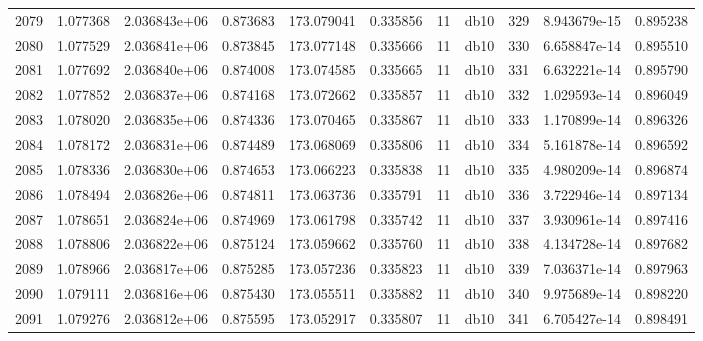 \begin{tabular}{lrrrrrrlrrr}
2079 &    1.077368 &        2.036843e+06 &  0.873683 &              173.079041 &    0.335856 &      11 &         db10 &    329 &   8.943679e-15 &      0.895238 \\
2080 &    1.077529 &        2.036841e+06 &  0.873845 &              173.077148 &    0.335666 &      11 &         db10 &    330 &   6.658847e-14 &      0.895510 \\
2081 &    1.077692 &        2.036840e+06 &  0.874008 &              173.074585 &    0.335665 &      11 &         db10 &    331 &   6.632221e-14 &      0.895790 \\
2082 &    1.077852 &        2.036837e+06 &  0.874168 &              173.072662 &    0.335857 &      11 &         db10 &    332 &   1.029593e-14 &      0.896049 \\
2083 &    1.078020 &        2.036835e+06 &  0.874336 &              173.070465 &    0.335867 &      11 &         db10 &    333 &   1.170899e-14 &      0.896326 \\
2084 &    1.078172 &        2.036831e+06 &  0.874489 &              173.068069 &    0.335806 &      11 &         db10 &    334 &   5.161878e-14 &      0.896592 \\
2085 &    1.078336 &        2.036830e+06 &  0.874653 &              173.066223 &    0.335838 &      11 &         db10 &    335 &   4.980209e-14 &      0.896874 \\
2086 &    1.078494 &        2.036826e+06 &  0.874811 &              173.063736 &    0.335791 &      11 &         db10 &    336 &   3.722946e-14 &      0.897134 \\
2087 &    1.078651 &        2.036824e+06 &  0.874969 &              173.061798 &    0.335742 &      11 &         db10 &    337 &   3.930961e-14 &      0.897416 \\
2088 &    1.078806 &        2.036822e+06 &  0.875124 &              173.059662 &    0.335760 &      11 &         db10 &    338 &   4.134728e-14 &      0.897682 \\
2089 &    1.078966 &        2.036817e+06 &  0.875285 &              173.057236 &    0.335823 &      11 &         db10 &    339 &   7.036371e-14 &      0.897963 \\
2090 &    1.079111 &        2.036816e+06 &  0.875430 &              173.055511 &    0.335882 &      11 &         db10 &    340 &   9.975689e-14 &      0.898220 \\
2091 &    1.079276 &        2.036812e+06 &  0.875595 &              173.052917 &    0.335807 &      11 &         db10 &    341 &   6.705427e-14 &      0.898491 \\

\end{tabular}
